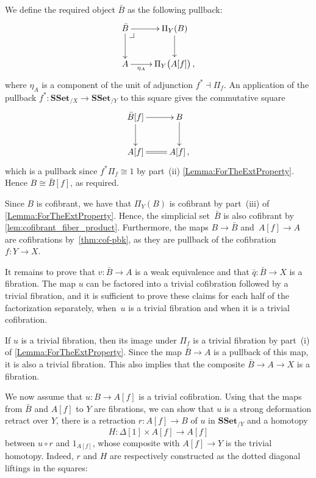 \documentclass[reqno,10pt,a4paper,oneside,draft]{amsart}
\makeatletter
\renewenvironment{proof}[1][\proofname] {\par\pushQED{\qed}\normalfont\topsep6\p@\@plus6\p@\relax\trivlist\item[\hskip\labelsep\bf#1\@addpunct{.}]\ignorespaces}{\popQED\endtrivlist\@endpefalse}
\numberwithin{equation}{section}
\theoremstyle{mythm}
\theoremstyle{mydef}
\theoremstyle{myrmk}
\newcommand{\pullback}[1]{\save*!/#1-1.2pc/#1:(-1,1)@^{|-}\restore}
\newcommand{\drpullback}{\pullback{dr}}
\newcommand{\ie}{\text{i.e.\ }}
\newcommand{\co}{\colon}
\newcommand{\iso}{\cong}
\newcommand{\SSet}{\mathbf{SSet}}
\makeatother
\begin{document}
\begin{proof} We define the required object $\bar{B}$ as the following pullback:
\[\xymatrix{
\bar{B} \ar[d] \ar[r] \drpullback & \Pi_Y(B) \ar[d] \\
A \ar[r]_-{\eta_{A}} & \Pi_Y \big( A[f]  \big) \, ,
}\]
where $\eta_{A}$ is  a component of the unit of adjunction  $f^* \dashv \Pi_f$. An application of the pullback $f^* \co \SSet_{/X} \to \SSet_{/Y}$ to this square gives the commutative square
\[\xymatrix{
\bar{B}[f] \ar[d] \ar[r]  & B \ar[d] \\
A[f] \ar@{=}[r] &A[f] \, ,
}\]
which is a pullback since $f^* \Pi_f \iso 1$ by part~(ii) \cref{Lemma:ForTheExtProperty}. Hence 
$B \iso \bar{B}[f]$, as required.


Since $B$ is cofibrant, we have that $\Pi_Y(B)$ is cofibrant by part~(iii) of  \cref{Lemma:ForTheExtProperty}. Hence, the simplicial set~$\bar{B}$  is also cofibrant by \cref{lem:cofibrant_fiber_product}. Furthermore, the maps $B \rightarrow \bar{B}$ and~$A[f] \rightarrow A$ are cofibrations by~\cref{thm:cof-pbk}, as they are pullback of the cofibration~$f \co Y \rightarrow X$.





It remains to prove that $v \co \bar{B} \rightarrow A$ is a weak equivalence and that $\bar{q} \co \bar{B} \rightarrow X$ is a fibration. The map $u$ can be factored into a trivial cofibration followed by a trivial fibration, and it is sufficient to prove these claims for each half of the factorization separately, \ie when~$u$ is a trivial fibration and when it is a trivial cofibration.

If $u$ is a trivial fibration, then its image under $\Pi_f$ is a trivial fibration by 
part~(i) of \cref{Lemma:ForTheExtProperty}. Since the map $\bar{B} \rightarrow A$ is a pullback of this map,
it is also a trivial fibration. This also implies that the composite $\bar{B} \rightarrow A \rightarrow X$ is a fibration.


We now assume that $u \co B \rightarrow A[f]$ is a trivial cofibration. Using that the maps from $\bar{B}$ and $A[f]$ to $Y$ are fibrations, we can show that $u$ is a strong deformation retract over $Y$, \ie there is a retraction $r \co A[f] \rightarrow B$ of $u$ in $\SSet_{/Y}$ and a homotopy 
\[
H \co \Delta[1] \times A[f] \rightarrow A[f]
\] 
between 
$u \circ r$ and $1_{A[f]}$, whose composite with $A[f] \rightarrow Y$ is the trivial homotopy. Indeed, $r$ and  $H$ are respectively constructed as the dotted diagonal liftings in the squares:


\end{proof}
\end{document}
